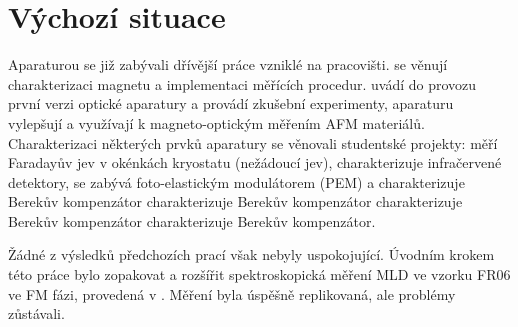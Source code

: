 \section{Výchozí situace}
\label{chap:vychozi-situace}

Aparaturou se již zabývali dřívější práce vzniklé na pracovišti.
 se věnují charakterizaci magnetu a implementaci měřících procedur.
 uvádí do provozu první verzi optické aparatury a provádí zkušební experimenty,  aparaturu vylepšují a využívají k magneto-optickým měřením AFM materiálů.
Charakterizaci některých prvků aparatury se věnovali studentské projekty:  měří Faradayův jev v okénkách kryostatu (nežádoucí jev),  charakterizuje infračervené  detektory,  se zabývá foto-elastickým modulátorem (PEM) a  charakterizuje Berekův kompenzátor charakterizuje Berekův kompenzátor charakterizuje Berekův kompenzátor charakterizuje Berekův kompenzátor.

Žádné z výsledků předchozích prací však nebyly uspokojující.
Úvodním krokem této práce bylo zopakovat a rozšířit spektroskopická měření MLD ve vzorku FR06 ve FM fázi, provedená v .
Měření byla úspěšně replikovaná, ale problémy zůstávali.
